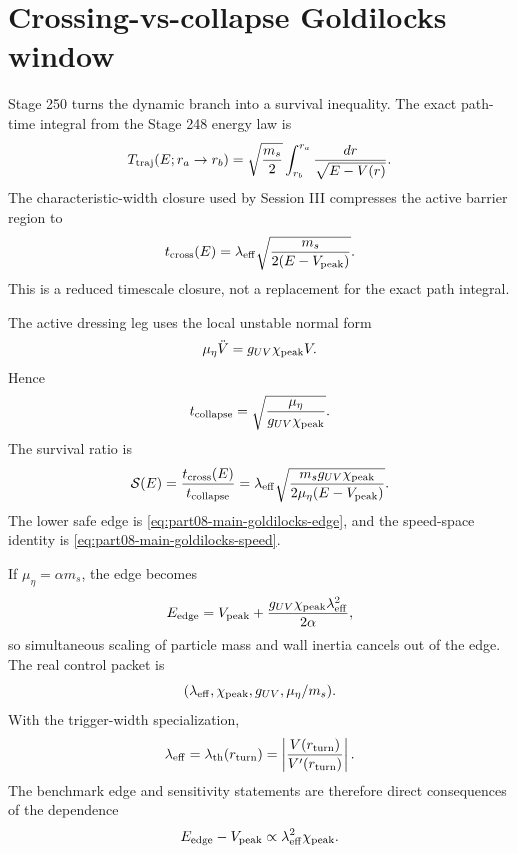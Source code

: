 \section{Crossing-vs-collapse Goldilocks window}
\label{sec:part08_relaxed_branch:crossing-vs-collapse-goldilocks-window}

Stage 250 turns the dynamic branch into a survival inequality.  The exact path-time integral from the Stage 248 energy law is
\begin{equation}
\label{eq:part08-stage250-path-time}
T_{\rm traj}(E;r_a\to r_b)
=
\sqrt{\frac{m_s}{2}}
\int_{r_b}^{r_a}\frac{dr}{\sqrt{E-V(r)}}.
\end{equation}
The characteristic-width closure used by Session III compresses the active barrier region to
\begin{equation}
\label{eq:part08-stage250-cross-time}
t_{\rm cross}(E)
=
\lambda_{\rm eff}\sqrt{\frac{m_s}{2(E-V_{\rm peak})}}.
\end{equation}
This is a reduced timescale closure, not a replacement for the exact path integral.

The active dressing leg uses the local unstable normal form
\begin{equation}
\label{eq:part08-stage250-v-leg}
\mu_\eta\ddot V=g_{UV}\chi_{\rm peak}V.
\end{equation}
Hence
\begin{equation}
\label{eq:part08-stage250-collapse-time}
t_{\rm collapse}=
\sqrt{\frac{\mu_\eta}{g_{UV}\chi_{\rm peak}}}.
\end{equation}
The survival ratio is
\begin{equation}
\label{eq:part08-stage250-survival-ratio}
\mathcal S(E)=\frac{t_{\rm cross}(E)}{t_{\rm collapse}}
=
\lambda_{\rm eff}
\sqrt{\frac{m_sg_{UV}\chi_{\rm peak}}{2\mu_\eta(E-V_{\rm peak})}}.
\end{equation}
The lower safe edge is \cref{eq:part08-main-goldilocks-edge}, and the speed-space identity is \cref{eq:part08-main-goldilocks-speed}.

If \(\mu_\eta=\alpha m_s\), the edge becomes
\begin{equation}
\label{eq:part08-stage250-heavy-edge}
E_{\rm edge}=V_{\rm peak}+\frac{g_{UV}\chi_{\rm peak}\lambda_{\rm eff}^{2}}{2\alpha},
\end{equation}
so simultaneous scaling of particle mass and wall inertia cancels out of the edge.  The real control packet is
\begin{equation}
\label{eq:part08-stage250-control-packet}
(\lambda_{\rm eff},\chi_{\rm peak},g_{UV},\mu_\eta/m_s).
\end{equation}
With the trigger-width specialization,
\begin{equation}
\label{eq:part08-stage250-trigger-width}
\lambda_{\rm eff}=\lambda_{\rm th}(r_{\rm turn})=
\left|\frac{V(r_{\rm turn})}{V'(r_{\rm turn})}\right|.
\end{equation}
The benchmark edge and sensitivity statements are therefore direct consequences of the dependence
\begin{equation}
\label{eq:part08-stage250-edge-sensitivity}
E_{\rm edge}-V_{\rm peak}\propto\lambda_{\rm eff}^{2}\chi_{\rm peak}.
\end{equation}

